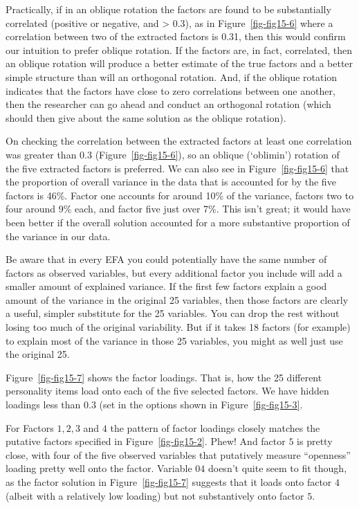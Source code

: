 \documentclass[
  a4paper,
]{book}
\begin{document}
Practically, if in an oblique rotation the factors are found to be
substantially correlated (positive or negative, and \textgreater{} 0.3),
as in Figure~\ref{fig-fig15-6} where a correlation between two of the
extracted factors is 0.31, then this would confirm our intuition to
prefer oblique rotation. If the factors are, in fact, correlated, then
an oblique rotation will produce a better estimate of the true factors
and a better simple structure than will an orthogonal rotation. And, if
the oblique rotation indicates that the factors have close to zero
correlations between one another, then the researcher can go ahead and
conduct an orthogonal rotation (which should then give about the same
solution as the oblique rotation).

On checking the correlation between the extracted factors at least one
correlation was greater than 0.3 (Figure~\ref{fig-fig15-6}), so an
oblique (`oblimin') rotation of the five extracted factors is preferred.
We can also see in Figure~\ref{fig-fig15-6} that the proportion of
overall variance in the data that is accounted for by the five factors
is 46\%. Factor one accounts for around 10\% of the variance, factors
two to four around 9\% each, and factor five just over 7\%. This isn't
great; it would have been better if the overall solution accounted for a
more substantive proportion of the variance in our data.

Be aware that in every EFA you could potentially have the same number of
factors as observed variables, but every additional factor you include
will add a smaller amount of explained variance. If the first few
factors explain a good amount of the variance in the original 25
variables, then those factors are clearly a useful, simpler substitute
for the 25 variables. You can drop the rest without losing too much of
the original variability. But if it takes 18 factors (for example) to
explain most of the variance in those 25 variables, you might as well
just use the original 25.

Figure~\ref{fig-fig15-7} shows the factor loadings. That is, how the 25
different personality items load onto each of the five selected factors.
We have hidden loadings less than \(0.3\) (set in the options shown in
Figure~\ref{fig-fig15-3}.

For Factors \(1, 2, 3\) and \(4\) the pattern of factor loadings closely
matches the putative factors specified in Figure~\ref{fig-fig15-2}.
Phew! And factor \(5\) is pretty close, with four of the five observed
variables that putatively measure ``openness'' loading pretty well onto
the factor. Variable \(04\) doesn't quite seem to fit though, as the
factor solution in Figure~\ref{fig-fig15-7} suggests that it loads onto
factor \(4\) (albeit with a relatively low loading) but not
substantively onto factor \(5\).
\end{document}
